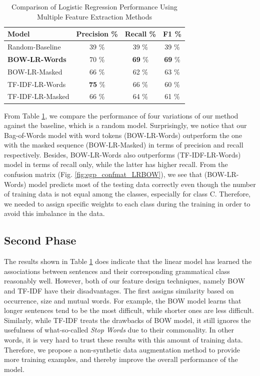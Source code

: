 \begin{table}
\centering
\caption{Comparison of Logistic Regression Performance Using Multiple Feature Extraction Methods}
\begin{tabular}{|l|c|c|c|} 
\hline
Model                  & Precision \%    & Recall \%       & F1 \%            \\ 
\hline
Random-Baseline        & 39 \%           & 39 \%           & 39 \%            \\ 
\hline
\textbf{BOW-LR-Words}  & 70 \%           & \textbf{69} \%  & \textbf{69} \%   \\ 
\hline
BOW-LR-Masked          & 66 \%           & 62 \%           & 63 \%            \\ 
\hline
TF-IDF-LR-Words        & \textbf{75} \%  & 66 \%           & 60 \%            \\ 
\hline
TF-IDF-LR-Masked       & 66 \%           & 64 \%           & 61 \%            \\
\hline
\end{tabular}
\label{tb:egp_lr_performance}
\end{table}

From Table \ref{tb:egp_lr_performance}, we compare the performance of four variations of our method against the baseline, which is a random model. Surprisingly, we notice that our Bag-of-Words model with word tokens (BOW-LR-Words) outperform the one with the masked sequence (BOW-LR-Masked) in terms of precision and recall respectively. Besides, BOW-LR-Words also outperforms (TF-IDF-LR-Words) model in terms of recall only, while the latter has higher recall. From the confusion matrix (Fig. \ref{fig:egp_confmat_LRBOW}), we see that (BOW-LR-Words) model predicts most of the testing data correctly even though the number of training data is not equal among the classes, especially for class C. Therefore, we needed to assign specific weights to each class during the training in order to avoid this imbalance in the data. 

\subsection{Second Phase}

The results shown in Table \ref{tb:egp_lr_performance} does indicate that the linear model has learned the associations between sentences and their corresponding grammatical class reasonably well. However, both of our feature design techniques, namely BOW and TF-IDF have their disadvantages. The first assigns similarity based on occurrence, size and mutual words. For example, the BOW model learns that longer sentences tend to be the most difficult, while shorter ones are less difficult. Similarly, while TF-IDF treats the drawbacks of BOW model, it still ignores the usefulness of what-so-called \textit{Stop Words} due to their commonality. In other words, it is very hard to trust these results with this amount of training data. Therefore, we propose a non-synthetic data augmentation method to provide more training examples, and thereby improve the overall performance of the model. 

